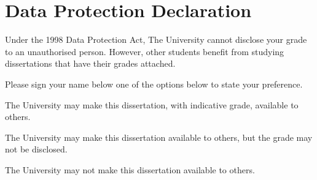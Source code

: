 \section*{Data Protection Declaration}
\vspace{0.5cm}
\begin{flushleft}
Under the 1998 Data Protection Act, The University cannot disclose your grade to an unauthorised person. However, other students benefit from studying dissertations that have their grades attached. \newline

\vspace{0.5cm}

Please sign your name below one of the options below to state your preference.\newline
\vspace{0.5cm}

The University may make this dissertation, with indicative grade, available to others.\newline
\vspace{3cm}


The University may make this dissertation available to others, but the grade may not be disclosed.\newline
\vspace{3cm}


The University may not make this dissertation available to others.\newline
\end{flushleft}

